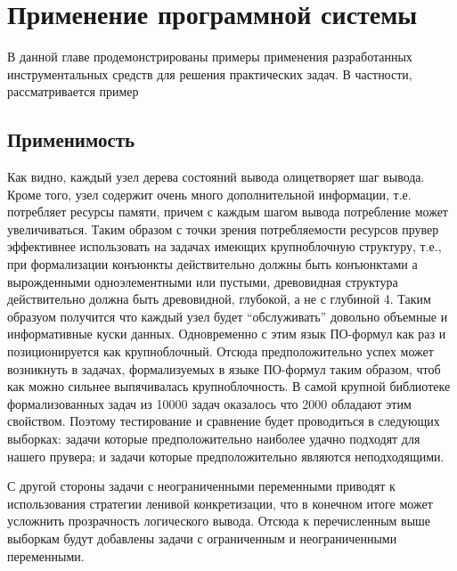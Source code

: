 \chapter{Применение программной системы}
\label{part:examples}

В данной главе продемонстрированы примеры применения разработанных инструментальных средств  для решения практических задач. В частности, рассматривается пример 

\section{Применимость}
Как видно, каждый узел дерева состояний вывода олицетворяет шаг вывода. Кроме того, узел содержит очень много дополнительной информации, т.е. потребляет ресурсы памяти, причем с каждым шагом вывода потребление может увеличиваться. Таким образом с точки зрения потребляемости ресурсов прувер эффективнее использовать на задачах имеющих крупноблочную структуру, т.е., при формализации конъюнкты действительно должны быть конъюнктами а вырожденными одноэлементными или пустыми, древовидная структура действительно должна быть древовидной, глубокой, а не с глубиной 4. Таким образуом получится что каждый узел будет “обслуживать” довольно объемные и информативные куски данных. Одновременно с этим язык ПО-формул как раз и позиционируется как крупноблочный. Отсюда предположительно успех может возникнуть в задачах, формализуемых в языке ПО-формул таким образом, чтоб как можно сильнее выпячивалась крупноблочность. В самой крупной библиотеке формализованных задач из 10000 задач оказалось что 2000 обладают этим свойством. Поэтому тестирование и сравнение будет проводиться в следующих выборках: задачи которые предположительно наиболее удачно подходят для нашего прувера; и задачи которые предположительно являются неподходящими. 

С другой стороны задачи с неограниченными переменными приводят к использования стратегии ленивой конкретизации, что в конечном итоге может усложнить прозрачность логического вывода. Отсюда к перечисленным выше выборкам будут добавлены задачи с ограниченным и неограниченными переменными.

